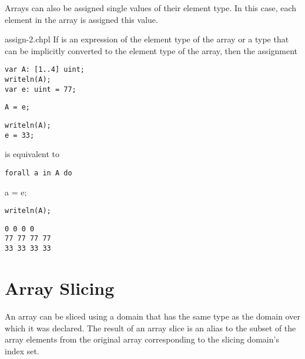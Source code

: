 
Arrays can also be assigned single values of their element type.  In
this case, each element in the array is assigned this value.
\begin{chapelexample}{assign-2.chpl}
If  is an expression of the element type of the array or a
type that can be implicitly converted to the element type of the
array, then the assignment
\begin{chapelpre}
\begin{verbatim}
var A: [1..4] uint;
writeln(A);
var e: uint = 77;
\end{verbatim}
\end{chapelpre}
\begin{chapel}
\begin{verbatim}
A = e;
\end{verbatim}
\end{chapel}
\begin{chapelnoprint}
\begin{verbatim}
writeln(A);
e = 33;
\end{verbatim}
\end{chapelnoprint}
is equivalent to
\begin{chapel}
\begin{verbatim}
forall a in A do
\end{verbatim}
  a = e;
\end{chapel}
\begin{chapelpost}
\begin{verbatim}
writeln(A);
\end{verbatim}
\end{chapelpost}
\begin{chapeloutput}
\begin{verbatim}
0 0 0 0
77 77 77 77
33 33 33 33
\end{verbatim}
\end{chapeloutput}
\end{chapelexample}

\section{Array Slicing}
\label{Array_Slicing}

An array can be sliced using a domain that has the same type as the
domain over which it was declared.  The result of an array slice is an
alias to the subset of the array elements from the original array
corresponding to the slicing domain's index set.
 
